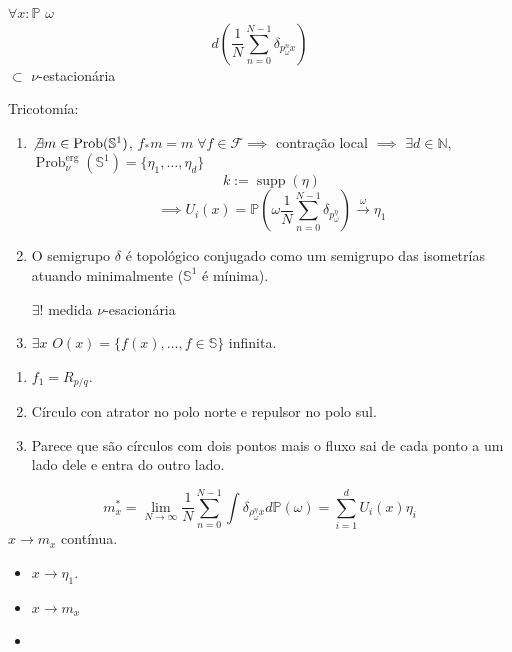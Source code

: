 \medskip{}

\begin{theorem}
\label{theorem-sp-furst}
$\forall x:\mathbb{P}$ $\omega$
$$
d\left( \frac{1}{N}\sum_{n=0}^{N-1}
\delta_{p^n_\omega x} \right)
$$
$\subset$ $\nu$-estacionária
\end{theorem}

\begin{theorem}
\label{theorem-sp-malicet}
Tricotomía:
\begin{enumerate}
\item $\not \exists
m\in\operatorname{Prob}(\mathbb{S}^1)$,
$f_*m=m\;\forall f\in\mathcal{F}\implies $
contração local $\implies $ $\exists
d\in\mathbb{N}$,
$\operatorname{Prob}_{\nu}^
{\operatorname{erg}}
(\mathbb{S}^1)=\{\eta_1,\ldots,\eta_d\}$
$$
k:=\operatorname{supp}(\eta)
$$
$$
\implies U_i(x)=\mathbb{P}\left(\omega
\frac{1}{N}\sum_{n=0}^{N-1}
\delta_{p_\omega^\eta}\right)
\overset{\omega}{\longrightarrow}\eta_1
$$

\item O semigrupo $\delta$ é topológico
conjugado como um semigrupo das isometrías
atuando minimalmente
($\mathbb{S}^1$ é mínima).

$\exists !$ medida $\nu$-esacionária

\item $\exists x$
$O(x)=\{f(x),\ldots,f\in\mathbb{S}\}$
infinita.
\end{enumerate}
\end{theorem}

\begin{example}[Exemplos]
\label{example-sp-exemplos}
\begin{enumerate}
\item $f_1=R_{p/q}$.
\item Círculo con atrator no polo norte e
repulsor no polo sul.
\item[Desenho] Parece que são círculos com
dois pontos mais o fluxo sai de cada ponto a
um lado dele e entra do outro lado.
\end{enumerate}
\end{example}

\medskip{}
$$
m^* _x=\lim_{N\to \infty}\frac{1}{N}
\sum_{n=0}^{N-1}\int
\delta_{\rho^\eta_\omega x}
d\mathbb{P}(\omega)
=\sum_{i=1}^d U_i(x)\eta_i
$$
$x\longrightarrow m_x$ contínua.

\begin{itemize}
\item[$d=1$] $x\longrightarrow \eta_1$.
\item[$d=2$] $x\longrightarrow m_x$
\item[$d>2$]
[Desnhos de triangulo e quadrado]
\end{itemize}

